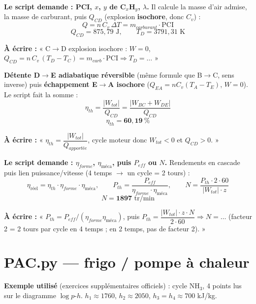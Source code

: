 \documentclass[11pt,a4paper]{article}
\begin{document}
\begin{step}
\textbf{Le script demande : PCI, $x$, $y$ de C$_x$H$_y$, $\lambda$.} Il calcule la masse d'air
admise, la masse de carburant, puis $Q_{CD}$ (explosion \textbf{isochore}, donc $C_v$) :
\[ Q = n\,C_v\,\Delta T = m_{carburant}\cdot \text{PCI} \]
\[ Q_{CD} = 875{,}79\text{ J},\qquad T_D = 3791{,}31\text{ K} \]
\end{step}
\begin{ecrire}
\textbf{À écrire :} « C$\to$D explosion isochore : $W=0$, $Q_{CD}=n\,C_v\,(T_D-T_C)=m_{carb}\cdot\text{PCI}
\Rightarrow T_D=\ldots$ »
\end{ecrire}

\begin{step}
\textbf{Détente D$\to$E adiabatique réversible} (même formule que B$\to$C, sens inverse) puis
\textbf{échappement E$\to$A isochore} ($Q_{EA}=nC_v(T_A-T_E)$, $W=0$). Le script fait la somme :
\[ \eta_{th} = \frac{|W_{tot}|}{Q_{CD}} = \frac{|W_{BC}+W_{DE}|}{Q_{CD}} \]
\[ \eta_{th} = \mathbf{60{,}19\ \%} \]
\end{step}
\begin{ecrire}
\textbf{À écrire :} « $\eta_{th}=\dfrac{|W_{tot}|}{Q_{apportée}}$, cycle moteur donc $W_{tot}<0$ et
$Q_{CD}>0$. »
\end{ecrire}

\begin{step}
\textbf{Le script demande : $\eta_{forme}$, $\eta_{\text{méca}}$, puis $P_{eff}$ ou $N$.} Rendements en
cascade puis lien puissance/vitesse (4 temps $\to$ un cycle = 2 tours) :
\[ \eta_{\text{réel}}=\eta_{th}\cdot\eta_{forme}\cdot\eta_{\text{méca}},\qquad
P_{th}=\frac{P_{eff}}{\eta_{forme}\cdot\eta_{\text{méca}}},\qquad
N = \frac{P_{th}\cdot 2\cdot 60}{|W_{tot}|\cdot z} \]
\[ N = \mathbf{1897}\text{ tr/min} \]
\end{step}
\begin{ecrire}
\textbf{À écrire :} « $P_{th}=P_{eff}/(\eta_{forme}\eta_{\text{méca}})$, puis
$P_{th}=\dfrac{|W_{tot}|\cdot z \cdot N}{2\cdot 60}\Rightarrow N=\ldots$ (facteur 2 = 2 tours par
cycle en 4 temps ; en 2 temps, pas de facteur 2). »
\end{ecrire}

\newpage
\section{PAC.py --- frigo / pompe à chaleur}

\begin{enonce}
\textbf{Exemple utilisé} (exercices supplémentaires officiels) : cycle NH$_3$, 4 points lus sur le
diagramme $\log p$-$h$. $h_1\approx1760$, $h_2\approx2050$, $h_3=h_4\approx700$ kJ/kg.
\end{enonce}
\end{document}
